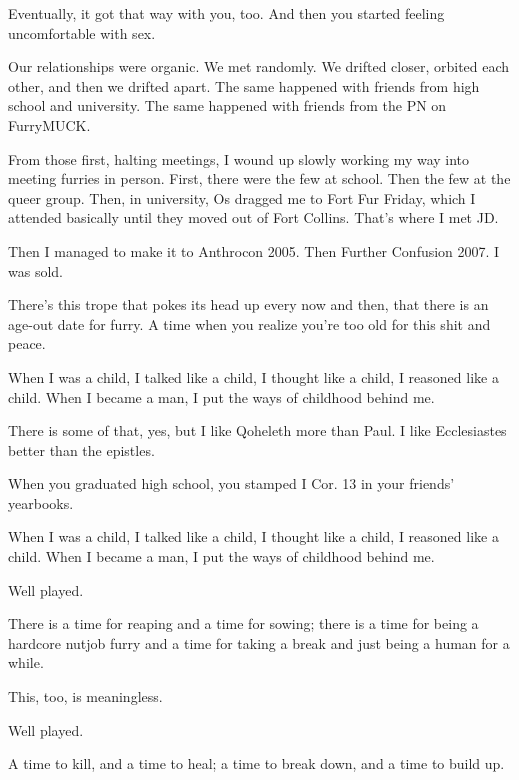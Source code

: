 \begin{leftcolumn}
\begin{ally}
Eventually, it got that way with you, too. And then you started feeling uncomfortable with sex.
\end{ally}
Our relationships were organic. We met randomly. We drifted closer, orbited each other, and then we drifted apart. The same happened with friends from high school and university. The same happened with friends from the PN on FurryMUCK.

From those first, halting meetings, I wound up slowly working my way into meeting furries in person. First, there were the few at school. Then the few at the queer group. Then, in university, Os dragged me to Fort Fur Friday, which I attended basically until they moved out of Fort Collins. That's where I met JD.

Then I managed to make it to Anthrocon 2005. Then Further Confusion 2007. I was sold.

There's this trope that pokes its head up every now and then, that there is an age-out date for furry. A time when you realize you're too old for this shit and peace.

\begin{ally}
When I was a child, I talked like a child, I thought like a child, I reasoned like a child. When I became a man, I put the ways of childhood behind me.
\end{ally}
There is some of that, yes, but I like Qoheleth more than Paul. I like Ecclesiastes better than the epistles.

\begin{ally}
When you graduated high school, you stamped I Cor. 13 in your friends' yearbooks.
\end{ally}
When I was a child, I talked like a child, I thought like a child, I reasoned like a child. When I became a man, I put the ways of childhood behind me.

\begin{ally}
Well played.
\end{ally}
There is a time for reaping and a time for sowing; there is a time for being a hardcore nutjob furry and a time for taking a break and just being a human for a while.

\begin{ally}
This, too, is meaningless.
\end{ally}
Well played.
\newpage

\noindent A time to kill, and a time to heal; a time to break down, and a time to build up.


\end{leftcolumn}
